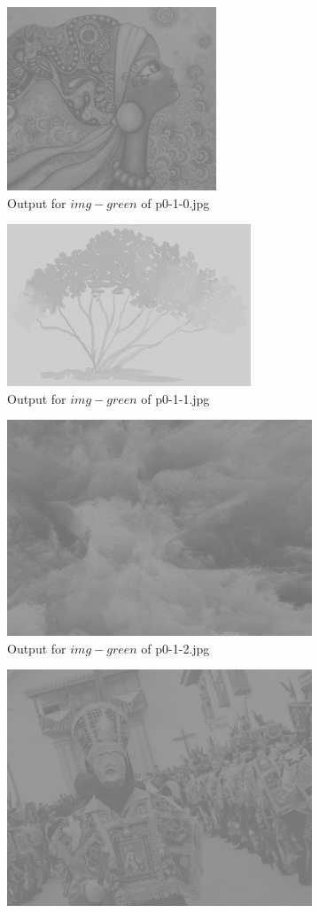 \begin{enumerate}[label=\emph{\alph*)}]
\begin{figure}[h!]
\centering
\begin{subfigure}{0.5\textwidth}
  \centering
  \includegraphics[width=0.5\linewidth]{../output/p0-4-b-0.jpg}
  \caption{Output for $img-green$ of p0-1-0.jpg}
  \label{fig:sfig1}
\end{subfigure}%
\begin{subfigure}{0.5\textwidth}
  \centering
  \includegraphics[width=0.5\linewidth]{../output/p0-4-b-1.jpg}
  \caption{Output for $img-green$ of  p0-1-1.jpg}
  \label{fig:sfig2}
\end{subfigure}
\begin{subfigure}{0.5\textwidth}
  \centering
  \includegraphics[width=0.5\linewidth]{../output/p0-4-b-2.jpg}
  \caption{Output for $img-green$ of p0-1-2.jpg}
  \label{fig:sfig3}
\end{subfigure}%
\begin{subfigure}{0.5\textwidth}
  \centering
  \includegraphics[width=0.5\linewidth]{../output/p0-4-b-3.jpg}

\end{subfigure}
\end{figure}
\end{enumerate}
